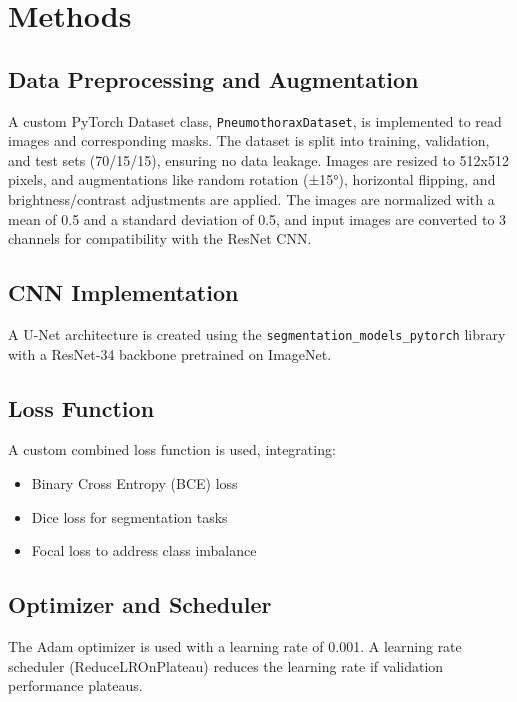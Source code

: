 \documentclass{article}
\begin{document}
\section*{Methods}
\subsection*{Data Preprocessing and Augmentation}
A custom PyTorch Dataset class, \texttt{PneumothoraxDataset}, is implemented to read images and corresponding masks. The dataset is split into training, validation, and test sets (70/15/15), ensuring no data leakage. Images are resized to 512x512 pixels, and augmentations like random rotation (±15°), horizontal flipping, and brightness/contrast adjustments are applied. The images are normalized with a mean of 0.5 and a standard deviation of 0.5, and input images are converted to 3 channels for compatibility with the ResNet CNN.

\subsection*{CNN Implementation}
A U-Net architecture is created using the \texttt{segmentation\_models\_pytorch} library with a ResNet-34 backbone pretrained on ImageNet.

\subsection*{Loss Function}
A custom combined loss function is used, integrating:
\begin{itemize}
    \item Binary Cross Entropy (BCE) loss
    \item Dice loss for segmentation tasks
    \item Focal loss to address class imbalance
\end{itemize}

\subsection*{Optimizer and Scheduler}
The Adam optimizer is used with a learning rate of 0.001. A learning rate scheduler (ReduceLROnPlateau) reduces the learning rate if validation performance plateaus.
\end{document}

